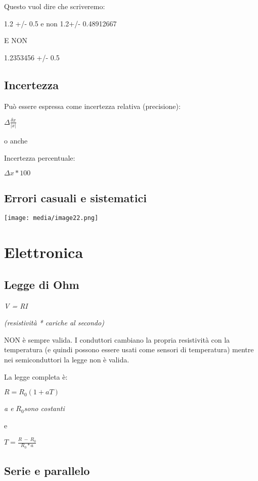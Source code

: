 Questo vuol dire che scriveremo:

1.2 +/- 0.5 e non 1.2+/- 0.48912667

E NON

1.2353456 +/- 0.5

\subsection{Incertezza}\label{incertezza}

Può essere espressa come incertezza relativa (precisione):

\(\Delta\frac{\delta x}{|x|}\)

o anche

Incertezza percentuale:

\(\Delta x*100\)

\subsection{Errori casuali e
sistematici}\label{errori-casuali-e-sistematici}

\texttt{[image: media/image22.png]}

\section{Elettronica}\label{elettronica}

\subsection{Legge di Ohm}\label{legge-di-ohm}

\emph{V = RI}

\emph{(resistività * cariche al secondo)}

NON è sempre valida. I conduttori cambiano la propria resistività con la
temperatura (e quindi possono essere usati come sensori di temperatura)
mentre nei semiconduttori la legge non è valida.

La legge completa è:

\(R = R_{0}(1 + aT)\)

\emph{a e} \(R_{0}\)\emph{sono costanti}

e

\(T = \frac{R\  - \ R_{0}}{R_{0}*a}\)

\subsection{Serie e parallelo}\label{serie-e-parallelo}

